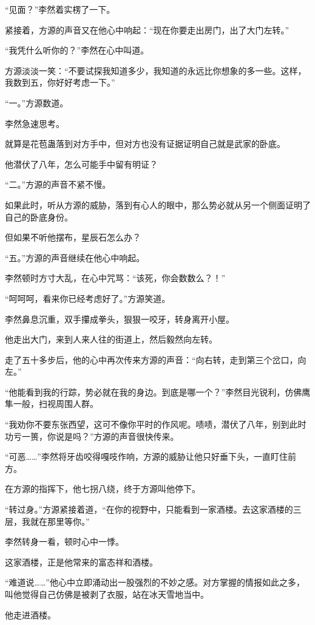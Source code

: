 \begin{this_body}
“见面？”李然着实楞了一下。

紧接着，方源的声音又在他心中响起：“现在你要走出房门，出了大门左转。”

“我凭什么听你的？”李然在心中叫道。

方源淡淡一笑：“不要试探我知道多少，我知道的永远比你想象的多一些。这样，我数到五，你好好考虑一下。”

“一。”方源数道。

李然急速思考。

就算是花苞蛊落到对方手中，但对方也没有证据证明自己就是武家的卧底。

他潜伏了八年，怎么可能手中留有明证？

“二。”方源的声音不紧不慢。

如果此时，听从方源的威胁，落到有心人的眼中，那么势必就从另一个侧面证明了自己的卧底身份。

但如果不听他摆布，星辰石怎么办？

“五。”方源的声音继续在他心中响起。

李然顿时方寸大乱，在心中咒骂：“该死，你会数数么？！”

“呵呵呵，看来你已经考虑好了。”方源笑道。

李然鼻息沉重，双手攥成拳头，狠狠一咬牙，转身离开小屋。

他走出大门，来到人来人往的街道上，然后毅然向左转。

走了五十多步后，他的心中再次传来方源的声音：“向右转，走到第三个岔口，向左。”

“他能看到我的行踪，势必就在我的身边。到底是哪一个？”李然目光锐利，仿佛鹰隼一般，扫视周围人群。

“我劝你不要东张西望，这可不像你平时的作风呢。啧啧，潜伏了八年，别到此时功亏一篑，你说是吗？”方源的声音很快传来。

“可恶……”李然将牙齿咬得嘎吱作响，方源的威胁让他只好垂下头，一直盯住前方。

在方源的指挥下，他七拐八绕，终于方源叫他停下。

“转过身。”方源紧接着道，“在你的视野中，只能看到一家酒楼。去这家酒楼的三层，我就在那里等你。”

李然转身一看，顿时心中一悸。

这家酒楼，正是他常来的富态祥和酒楼。

“难道说……”他心中立即涌动出一股强烈的不妙之感。对方掌握的情报如此之多，叫他觉得自己仿佛是被剥了衣服，站在冰天雪地当中。

他走进酒楼。


\end{this_body}
